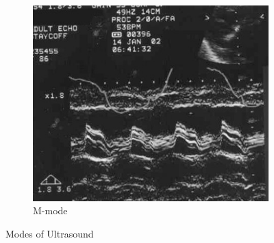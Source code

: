 \documentclass[12pt]{article}
\begin{document}
\begin{figure}[h!]
\begin{subfigure}[b]{0.32\linewidth}
  \end{subfigure}
  \begin{subfigure}[b]{0.32\linewidth}
    \centering
    \includegraphics[width=1\linewidth]{m.jpg}
    \caption{M-mode}
  \end{subfigure}
  \caption{Modes of Ultrasound}
  \label{fig:Projectional Radiography}
\end{figure}

\pagebreak
\end{document}
